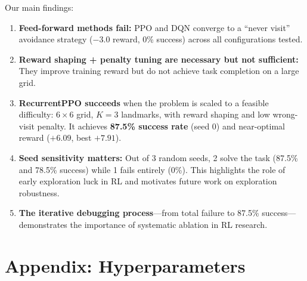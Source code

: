 \documentclass[11pt,a4paper]{article}
\begin{document}
Our main findings:
\begin{enumerate}[nosep]
  \item \textbf{Feed-forward methods fail:} PPO and DQN converge to a
        ``never visit'' avoidance strategy ($-3.0$ reward, 0\% success)
        across all configurations tested.
  \item \textbf{Reward shaping + penalty tuning are necessary but not
        sufficient:} They improve training reward but do not achieve
        task completion on a large grid.
  \item \textbf{RecurrentPPO succeeds} when the problem is scaled to a
        feasible difficulty: $6\times6$ grid, $K=3$ landmarks, with reward
        shaping and low wrong-visit penalty. It achieves \textbf{87.5\%
        success rate} (seed 0) and near-optimal reward ($+6.09$, best $+7.91$).
  \item \textbf{Seed sensitivity matters:} Out of 3 random seeds, 2 solve the
        task (87.5\% and 78.5\% success) while 1 fails entirely (0\%).
        This highlights the role of early exploration luck in RL and
        motivates future work on exploration robustness.
  \item \textbf{The iterative debugging process}---from total failure to
        87.5\% success---demonstrates the importance of systematic ablation
        in RL research.
\end{enumerate}

\section*{Appendix: Hyperparameters}
\end{document}
